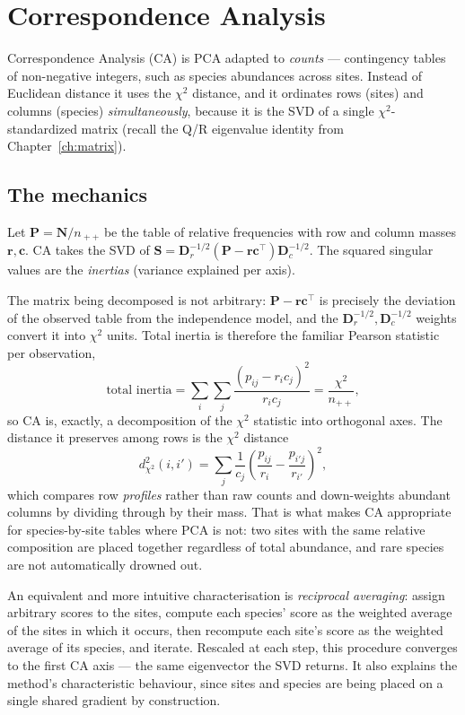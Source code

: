 \documentclass[11pt,oneside]{book}
\begin{document}
\chapter{Correspondence Analysis}
\label{ch:ca}
Correspondence Analysis (CA) is PCA adapted to \emph{counts} — contingency tables of
non-negative integers, such as species abundances across sites. Instead of Euclidean
distance it uses the $\chi^2$ distance, and it ordinates rows (sites) and columns
(species) \emph{simultaneously}, because it is the SVD of a single $\chi^2$-standardized
matrix (recall the Q/R eigenvalue identity from Chapter~\ref{ch:matrix}).

\section{The mechanics}
Let $\mathbf{P}=\mathbf{N}/n_{\!++}$ be the table of relative frequencies with row and
column masses $\mathbf{r},\mathbf{c}$. CA takes the SVD of
$\mathbf{S}=\mathbf{D}_r^{-1/2}(\mathbf{P}-\mathbf{r}\mathbf{c}^{\!\top})\mathbf{D}_c^{-1/2}$.
The squared singular values are the \emph{inertias} (variance explained per axis).

The matrix being decomposed is not arbitrary: $\mathbf{P}-\mathbf{r}\mathbf{c}^{\!\top}$ is
precisely the deviation of the observed table from the independence model, and the
$\mathbf{D}_r^{-1/2},\mathbf{D}_c^{-1/2}$ weights convert it into $\chi^2$ units. Total
inertia is therefore the familiar Pearson statistic per observation,
\[
  \text{total inertia}=\sum_{i}\sum_{j}\frac{(p_{ij}-r_i c_j)^2}{r_i c_j}=\frac{\chi^{2}}{n_{++}},
\]
so CA is, exactly, a decomposition of the $\chi^2$ statistic into orthogonal axes. The
distance it preserves among rows is the $\chi^2$ distance
\[
  d^2_{\chi^2}(i,i')=\sum_{j}\frac{1}{c_j}\left(\frac{p_{ij}}{r_i}-\frac{p_{i'j}}{r_{i'}}\right)^{2},
\]
which compares row \emph{profiles} rather than raw counts and down-weights abundant columns
by dividing through by their mass. That is what makes CA appropriate for species-by-site
tables where PCA is not: two sites with the same relative composition are placed together
regardless of total abundance, and rare species are not automatically drowned out.

An equivalent and more intuitive characterisation is \emph{reciprocal averaging}: assign
arbitrary scores to the sites, compute each species' score as the weighted average of the
sites in which it occurs, then recompute each site's score as the weighted average of its
species, and iterate. Rescaled at each step, this procedure converges to the first CA axis
— the same eigenvector the SVD returns. It also explains the method's characteristic
behaviour, since sites and species are being placed on a single shared gradient by
construction.
\end{document}
